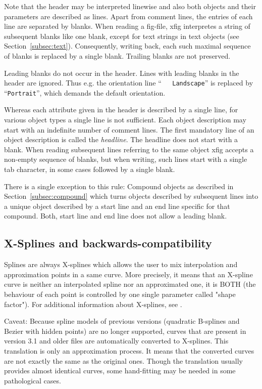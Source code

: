 \documentclass[10pt, a4paper]{article}
\begin{document}
Note that the header may be interpreted linewise 
and also both objects and their parameters are described as lines. 
Apart from comment lines, the entries of each line are separated by blanks. 
When reading a fig-file, 
xfig interpretes a string of subsequent blanks like one blank, 
except for text strings in text objects (see Section~\ref{subsec:text}). 
Consequently, writing back, each such maximal sequence of blanks 
is replaced by a single blank. 
Trailing blanks are not preserved. 

Leading blanks do not occur in the header. 
Lines with leading blanks in the header are ignored. 
Thus e.g. the orientation line 
``{\tt\ \ \ Landscape}'' is replaced by ``{\tt Portrait}'', 
which demands the default orientation. 

Whereas each attribute given in the header is described by a single line, 
for various object types a single line is not sufficient. 
Each object description may start with an indefinite number of comment lines. 
The first mandatory line of an object description is called the {\em headline}. 
The headline does not start with a blank. 
When reading subsequent lines referring to the same object 
xfig accepts a non-empty sequence of blanks, 
but when writing, such lines start with a single tab character, 
in some cases followed by a single blank. 

There is a single exception to this rule: 
Compound objects as described in Section~\ref{subsec:compound} 
which turns objects described by subsequent lines 
into a unique object described by a 
start line and an end line specific for that compound. 
Both, start line and end line does not allow a leading blank. 


\subsection{X-Splines and backwards-compatibility}

Splines are always X-splines 
which allows the user to mix interpolation and approximation 
points in a same curve. 
More precisely, it means that an X-spline curve 
is neither an interpolated spline nor an approximated one, 
it is BOTH (the behaviour of each point 
is controlled by one single parameter called "shape factor"). 
For additional information about X-splines, see \cite{XSpline}. 

Caveat: Because spline models of previous versions 
(quadratic B-splines and Bezier with hidden points) 
are no longer supported, 
curves that are present in version 3.1 and older files 
are automatically converted to X-splines. 
This translation is only an approximation process. 
It means that the converted curves 
are not exactly the same as the original ones. 
Though the translation usually provides almost identical curves, 
some hand-fitting may be needed in some pathological cases. 
\end{document}
